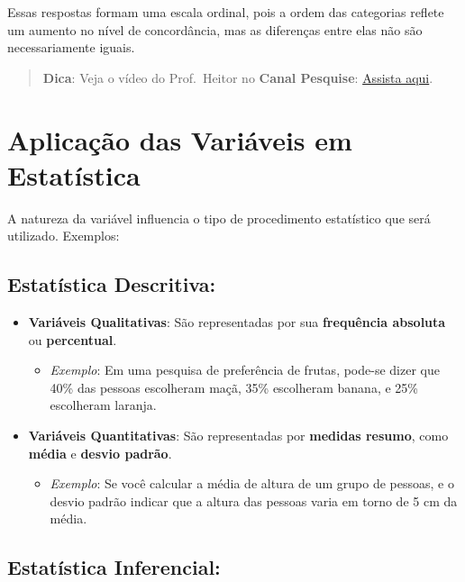 \documentclass[
]{book}
\providecommand{\tightlist}{%
  \setlength{\itemsep}{0pt}\setlength{\parskip}{0pt}}
\begin{document}
Essas respostas formam uma escala ordinal, pois a ordem das categorias reflete um aumento no nível de concordância, mas as diferenças entre elas não são necessariamente iguais.

\begin{quote}
\textbf{Dica}: Veja o vídeo do Prof.~Heitor no \textbf{Canal Pesquise}: \href{https://youtu.be/_oc37Ea_tl8}{Assista aqui}.
\end{quote}

\section{Aplicação das Variáveis em Estatística}\label{aplicauxe7uxe3o-das-variuxe1veis-em-estatuxedstica}

A natureza da variável influencia o tipo de procedimento estatístico que será utilizado. Exemplos:

\subsection{Estatística Descritiva:}\label{estatuxedstica-descritiva-1}

\begin{itemize}
\tightlist
\item
  \textbf{Variáveis Qualitativas}: São representadas por sua \textbf{frequência absoluta} ou \textbf{percentual}.

  \begin{itemize}
  \tightlist
  \item
    \emph{Exemplo}: Em uma pesquisa de preferência de frutas, pode-se dizer que 40\% das pessoas escolheram maçã, 35\% escolheram banana, e 25\% escolheram laranja.
  \end{itemize}
\item
  \textbf{Variáveis Quantitativas}: São representadas por \textbf{medidas resumo}, como \textbf{média} e \textbf{desvio padrão}.

  \begin{itemize}
  \tightlist
  \item
    \emph{Exemplo}: Se você calcular a média de altura de um grupo de pessoas, e o desvio padrão indicar que a altura das pessoas varia em torno de 5 cm da média.
  \end{itemize}
\end{itemize}

\subsection{Estatística Inferencial:}\label{estatuxedstica-inferencial-1}
\end{document}
